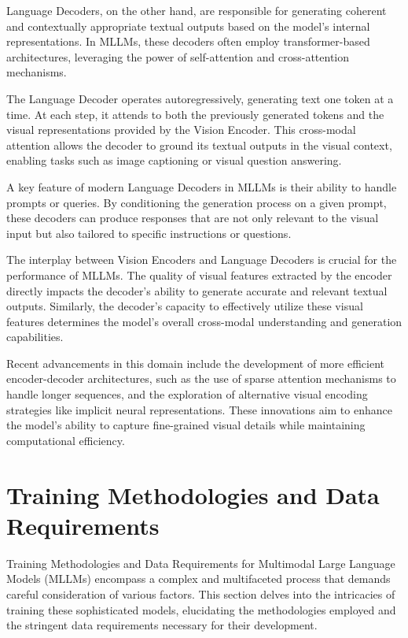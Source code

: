 Language Decoders, on the other hand, are responsible for generating coherent and contextually appropriate textual outputs based on the model's internal representations. In MLLMs, these decoders often employ transformer-based architectures, leveraging the power of self-attention and cross-attention mechanisms.

The Language Decoder operates autoregressively, generating text one token at a time. At each step, it attends to both the previously generated tokens and the visual representations provided by the Vision Encoder. This cross-modal attention allows the decoder to ground its textual outputs in the visual context, enabling tasks such as image captioning or visual question answering.

A key feature of modern Language Decoders in MLLMs is their ability to handle prompts or queries. By conditioning the generation process on a given prompt, these decoders can produce responses that are not only relevant to the visual input but also tailored to specific instructions or questions.

The interplay between Vision Encoders and Language Decoders is crucial for the performance of MLLMs. The quality of visual features extracted by the encoder directly impacts the decoder's ability to generate accurate and relevant textual outputs. Similarly, the decoder's capacity to effectively utilize these visual features determines the model's overall cross-modal understanding and generation capabilities.

Recent advancements in this domain include the development of more efficient encoder-decoder architectures, such as the use of sparse attention mechanisms to handle longer sequences, and the exploration of alternative visual encoding strategies like implicit neural representations. These innovations aim to enhance the model's ability to capture fine-grained visual details while maintaining computational efficiency.

\section{Training Methodologies and Data Requirements}
Training Methodologies and Data Requirements for Multimodal Large Language Models (MLLMs) encompass a complex and multifaceted process that demands careful consideration of various factors. This section delves into the intricacies of training these sophisticated models, elucidating the methodologies employed and the stringent data requirements necessary for their development.

